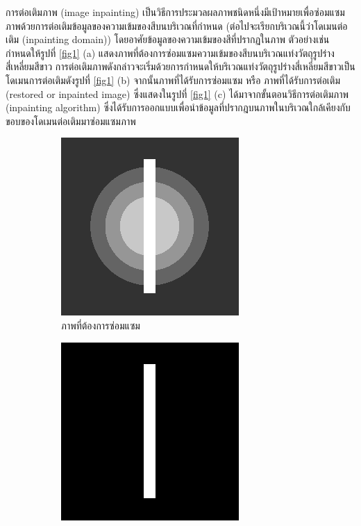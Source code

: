 \documentclass[hidelinks,a4paper]{article}
\numberwithin{equation}{section}							%
\begin{document}
{	\hspace{1cm} การต่อเติมภาพ (image inpainting) เป็นวิธีการประมวลผลภาพชนิดหนึ่งมีเป้าหมายเพื่อซ่อมแซมภาพด้วยการต่อเติมข้อมูลของความเข้มของสีบนบริเวณที่กำหนด (ต่อไปจะเรียกบริเวณนี้ว่าโดเมนต่อเติม (inpainting domain)) โดยอาศัยข้อมูลของความเข้มของสีที่ปรากฏในภาพ ตัวอย่างเช่น 
	กำหนดให้รูปที่ \ref{fig1} (a) แสดงภาพที่ต้องการซ่อมแซมความเข้มของสีบนบริเวณแท่งวัตถุรูปร่างสี่เหลี่ยมสีขาว การต่อเติมภาพดังกล่าวจะเริ่มด้วยการกำหนดให้บริเวณแท่งวัตถุรูปร่างสี่เหลี่ยมสีขาวเป็นโดเมนการต่อเติมดังรูปที่ \ref{fig1} (b) จากนั้นภาพที่ได้รับการซ่อมแซม หรือ ภาพที่ได้รับการต่อเติม (restored or inpainted image) ซึ่งแสดงในรูปที่ \ref{fig1} (c) ได้มาจากขั้นตอนวิธีการต่อเติมภาพ (inpainting algorithm) ซึ่งได้รับการออกแบบเพื่อนำข้อมูลที่ปรากฎบนภาพในบริเวณใกล้เคียงกับขอบของโดเมนต่อเติมมาซ่อมแซมภาพ 

	\begin{figure}[H]
		\centering
		\begin{subfigure}{0.3\linewidth}
			\centering
			\includegraphics[width=0.8\linewidth]{images/grayscale_inpaint/toinapint.png}
			\caption{ภาพที่ต้องการซ่อมแซม}
		\end{subfigure}
		\begin{subfigure}{0.3\linewidth}
			\centering
			\includegraphics[width=0.8\linewidth]{images/grayscale_inpaint/inpaintdomain.png}

\end{subfigure}
\end{figure}}
\end{document}
